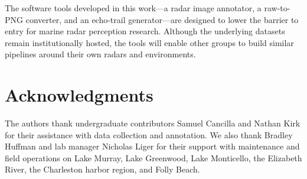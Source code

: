 \documentclass[twocolumn, 10pt]{article}
\begin{document}
The software tools developed in this work---a radar image annotator, a raw-to-PNG converter, and an echo-trail generator---are designed to lower the barrier to entry for marine radar perception research. Although the underlying datasets remain institutionally hosted, the tools will enable other groups to build similar pipelines around their own radars and environments.


\section*{Acknowledgments}
The authors thank undergraduate contributors Samuel Cancilla and Nathan Kirk for their assistance with data collection and annotation. We also thank Bradley Huffman and lab manager Nicholas Liger for their support with maintenance and field operations on Lake Murray, Lake Greenwood, Lake Monticello, the Elizabeth River, the Charleston harbor region, and Folly Beach. 



\end{document}
